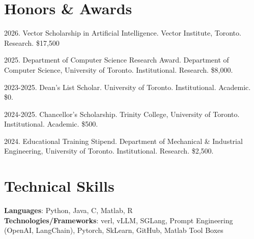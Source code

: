 \documentclass[letterpaper,11pt]{article}
\makeatletter
\newcommand{\resumeItem}[1]{
  \item\small{
    {#1 \vspace{-2pt}}
  }
}
\newcommand{\resumeSubheading}[4]{
  \vspace{-2pt}\item
    \begin{tabular*}{1.0\textwidth}[t]{l@{\extracolsep{\fill}}r}
      \textbf{#1} & \textbf{\small #2} \\
      \textit{\small#3} & \textit{\small #4} \\
    \end{tabular*}\vspace{-7pt}
}
\newcommand{\resumeSubHeadingListStart}{\begin{itemize}[leftmargin=0.0in, label={}]}
\newcommand{\resumeSubHeadingListEnd}{\end{itemize}}
\newcommand{\resumeItemListStart}{\begin{itemize}}
\newcommand{\resumeItemListEnd}{\end{itemize}\vspace{-5pt}}
\makeatother
\begin{document}
\section{Honors \& Awards}
\begin{itemize}[leftmargin=0.15in, label={}]
    \small{
        \item {
            2026. Vector Scholarship in Artificial Intelligence. Vector Institute, Toronto. Research. \$17,500
        }
        \item{
            2025. Department of Computer Science Research Award. Department of Computer Science, University of Toronto. Institutional. Research. \$8,000.
        }
        \item{
            2023-2025. Dean’s List Scholar. University of Toronto. Institutional. Academic. \$0.
        }
        \item{
            2024-2025. Chancellor’s Scholarship. Trinity College, University of Toronto. Institutional. Academic. \$500.
        }
        \item{
            2024. Educational Training Stipend. Department of Mechanical \& Industrial Engineering, University of Toronto. Institutional. Research. \$2,500.
        }
    }
\end{itemize}
\vspace{-16pt}


%
\section{Technical Skills}
 \begin{itemize}[leftmargin=0.15in, label={}]
    \small{\item{
     \textbf{Languages}{: Python, Java, C, Matlab, R} \\
     \textbf{Technologies/Frameworks}{: verl, vLLM, SGLang, Prompt Engineering (OpenAI, LangChain), Pytorch, SkLearn, GitHub, Matlab Tool Boxes} \\
    }}
 \end{itemize}
 \vspace{-16pt}


        
\end{document}
